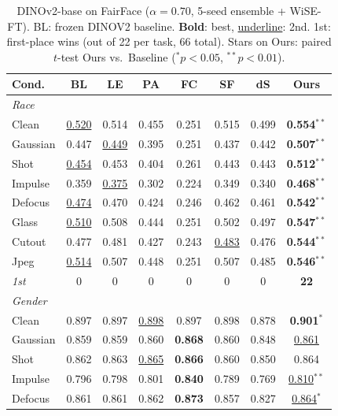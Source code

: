 \begin{table}[htbp]
\caption{DINOv2-base on FairFace ($\alpha{=}0.70$, 5-seed ensemble + WiSE-FT). BL: frozen DINOV2 baseline. \textbf{Bold}: best, \underline{underline}: 2nd. 1st: first-place wins (out of 22 per task, 66 total). Stars on Ours: paired $t$-test Ours vs.\ Baseline ($^{*}\!p{<}0.05$, $^{**}\!p{<}0.01$).}
\label{tab:app_dinov2_ff}
\centering
\scriptsize
\setlength{\tabcolsep}{3pt}
\renewcommand{\arraystretch}{0.9}
\begin{tabular}{lccccccc}
\toprule
Cond. & BL & LE & PA & FC & SF & dS & \textbf{Ours} \\
\midrule
\multicolumn{8}{l}{\textit{Race}} \\
Clean      & \underline{0.520} & 0.514 & 0.455 & 0.251 & 0.515 & 0.499 & \textbf{0.554}$^{**}$ \\
Gaussian   & 0.447 & \underline{0.449} & 0.395 & 0.251 & 0.437 & 0.442 & \textbf{0.507}$^{**}$ \\
Shot       & \underline{0.454} & 0.453 & 0.404 & 0.261 & 0.443 & 0.443 & \textbf{0.512}$^{**}$ \\
Impulse    & 0.359 & \underline{0.375} & 0.302 & 0.224 & 0.349 & 0.340 & \textbf{0.468}$^{**}$ \\
Defocus    & \underline{0.474} & 0.470 & 0.424 & 0.246 & 0.462 & 0.461 & \textbf{0.542}$^{**}$ \\
Glass      & \underline{0.510} & 0.508 & 0.444 & 0.251 & 0.502 & 0.497 & \textbf{0.547}$^{**}$ \\
Cutout     & 0.477 & 0.481 & 0.427 & 0.243 & \underline{0.483} & 0.476 & \textbf{0.544}$^{**}$ \\
Jpeg       & \underline{0.514} & 0.507 & 0.448 & 0.251 & 0.507 & 0.485 & \textbf{0.546}$^{**}$ \\
\textit{1st} & 0 & 0 & 0 & 0 & 0 & 0 & \textbf{22} \\
\midrule
\multicolumn{8}{l}{\textit{Gender}} \\
Clean      & 0.897 & 0.897 & \underline{0.898} & 0.897 & 0.898 & 0.878 & \textbf{0.901}$^{*}$ \\
Gaussian   & 0.859 & 0.859 & 0.860 & \textbf{0.868} & 0.860 & 0.848 & \underline{0.861} \\
Shot       & 0.862 & 0.863 & \underline{0.865} & \textbf{0.866} & 0.860 & 0.850 & 0.864 \\
Impulse    & 0.796 & 0.798 & 0.801 & \textbf{0.840} & 0.789 & 0.769 & \underline{0.810}$^{**}$ \\
Defocus    & 0.861 & 0.861 & 0.862 & \textbf{0.873} & 0.857 & 0.827 & \underline{0.864}$^{*}$ \\

\end{tabular}
\end{table}

